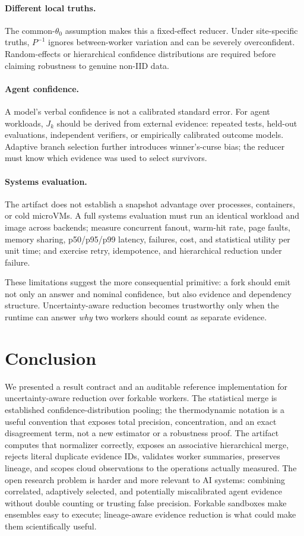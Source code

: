 \paragraph{Different local truths.} The common-$\theta_0$ assumption makes this a fixed-effect reducer. Under site-specific truths, $P^{-1}$ ignores between-worker variation and can be severely overconfident. Random-effects or hierarchical confidence distributions are required before claiming robustness to genuine non-IID data.

\paragraph{Agent confidence.} A model's verbal confidence is not a calibrated standard error. For agent workloads, $J_k$ should be derived from external evidence: repeated tests, held-out evaluations, independent verifiers, or empirically calibrated outcome models. Adaptive branch selection further introduces winner's-curse bias; the reducer must know which evidence was used to select survivors.

\paragraph{Systems evaluation.} The artifact does not establish a snapshot advantage over processes, containers, or cold microVMs. A full systems evaluation must run an identical workload and image across backends; measure concurrent fanout, warm-hit rate, page faults, memory sharing, p50/p95/p99 latency, failures, cost, and statistical utility per unit time; and exercise retry, idempotence, and hierarchical reduction under failure.

These limitations suggest the more consequential primitive: a fork should emit not only an answer and nominal confidence, but also evidence and dependency structure. Uncertainty-aware reduction becomes trustworthy only when the runtime can answer \emph{why} two workers should count as separate evidence.

\section{Conclusion}
\label{sec:conclusion}

We presented a result contract and an auditable reference implementation for uncertainty-aware reduction over forkable workers. The statistical merge is established confidence-distribution pooling; the thermodynamic notation is a useful convention that exposes total precision, concentration, and an exact disagreement term, not a new estimator or a robustness proof. The artifact computes that normalizer correctly, exposes an associative hierarchical merge, rejects literal duplicate evidence IDs, validates worker summaries, preserves lineage, and scopes cloud observations to the operations actually measured. The open research problem is harder and more relevant to AI systems: combining correlated, adaptively selected, and potentially miscalibrated agent evidence without double counting or trusting false precision. Forkable sandboxes make ensembles easy to execute; lineage-aware evidence reduction is what could make them scientifically useful.
